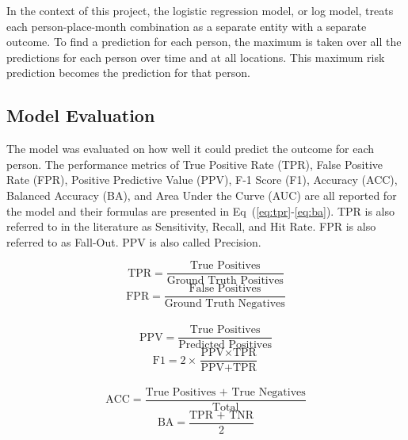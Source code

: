 \documentclass[10pt,letterpaper]{article}
\newcommand{\red}[1]{{\color{red}{#1}}}
\begin{document}
In the context of this project, the logistic regression model, or log model, treats each person-place-month combination as a separate entity with a separate outcome. To find a prediction for each person, the maximum is taken over all the predictions for each person over time and at all locations. This maximum risk prediction becomes the prediction for that person.

\subsection*{Model Evaluation}
The model was evaluated on how well it could predict the outcome for each person. The performance metrics of True Positive Rate (TPR), False Positive Rate (FPR), Positive Predictive Value (PPV), F-1 Score (F1), Accuracy (ACC), Balanced Accuracy (BA), and Area Under the Curve (AUC) are all reported for the model and their formulas are presented in Eq~(\ref{eq:tpr}-\ref{eq:ba}). TPR is also referred to in the literature as Sensitivity, Recall, and Hit Rate. FPR is also referred to as Fall-Out. PPV is also called Precision. 

\begin{multicols}{2}
    \begin{equation}
        \text{TPR} = \frac{\text{True Positives}}{\text{Ground Truth Positives}}
        \label{eq:tpr}
    \end{equation}\break
    \begin{equation}
        \text{FPR} = \frac{\text{False Positives}}{\text{Ground Truth Negatives}}
        \label{eq:fpr}
    \end{equation}
    \\
    \begin{equation}
        \text{PPV} = \frac{\text{True Positives}}{\text{Predicted Positives}}
        \label{eq:ppv}
    \end{equation}\break
    \begin{equation}
        \text{F1} = 2\times\frac{\text{PPV}\times\text{TPR}}{\text{PPV} + \text{TPR}}
        \label{eq:f1}
    \end{equation}
    \\
    \begin{equation}
        \text{ACC} = \frac{\text{True Positives + True Negatives}}{\text{Total}}
        \label{eq:acc}
    \end{equation}\break
    \begin{equation}
        \text{BA} = \frac{\text{TPR + TNR}}{2}
        \label{eq:ba}
    \end{equation}
\end{multicols}
\red{remove all or some of these equations?}
\end{document}
